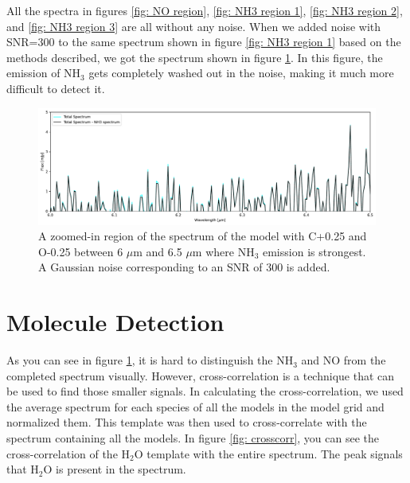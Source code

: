 \documentclass[twoside, single, authoryear, semicolon]{lion-msc}
\newcommand{\4}{$_4$}
\newcommand{\3}{$_3$}
\newcommand{\2}{$_2$}
\begin{document}
All the spectra in figures \ref{fig: NO region}, \ref{fig: NH3 region 1}, \ref{fig: NH3 region 2}, and \ref{fig: NH3 region 3} are all without any noise. When we added noise with SNR=300 to the same spectrum shown in figure \ref{fig: NH3 region 1} based on the methods described, we got the spectrum shown in figure \ref{fig: add noise}. In this figure, the emission of NH\3 gets completely washed out in the noise, making it much more difficult to detect it.  

\begin{figure}[!ht]
    \centering
    \includegraphics[width=\linewidth]{Figures/AddNoise.pdf}
    \caption{A zoomed-in region of the spectrum of the model with C+0.25 and O-0.25 between 6 $\mu$m and 6.5 $\mu$m where NH\3 emission is strongest. A Gaussian noise corresponding to an SNR of 300 is added.}
    \label{fig: add noise}
\end{figure}

\section{Molecule Detection}
As you can see in figure \ref{fig: add noise}, it is hard to distinguish the NH\3 and NO from the completed spectrum visually. However, cross-correlation is a technique that can be used to find those smaller signals. In calculating the cross-correlation, we used the average spectrum for each species of all the models in the model grid and normalized them. This template was then used to cross-correlate with the spectrum containing all the models. In figure \ref{fig: crosscorr}, you can see the cross-correlation of the H\2O template with the entire spectrum. The peak signals that H\2O is present in the spectrum. 
\end{document}
